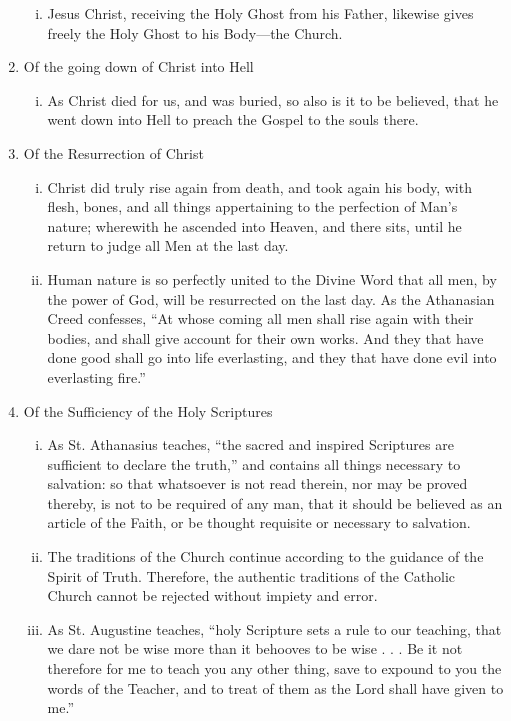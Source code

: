 \begin{enumerate}
\begin{enumerate}[i.]
		\item Jesus Christ, receiving the Holy Ghost from his Father, likewise gives freely the Holy Ghost to his Body---the Church.
	\end{enumerate}
	\item Of the going down of Christ into Hell
	\begin{enumerate}[i.]
		\item As Christ died for us, and was buried, so also is it to be believed, that he went down into Hell to preach the Gospel to the souls there.
	\end{enumerate}
	\item Of the Resurrection of Christ
	\begin{enumerate}[i.]
		\item Christ did truly rise again from death, and took again his body, with flesh, bones, and all things appertaining to the perfection of Man's nature; wherewith he ascended into Heaven, and there sits, until he return to judge all Men at the last day.
		\item Human nature is so perfectly united to the Divine Word that all men, by the power of God, will be resurrected on the last day. As the Athanasian Creed confesses, ``At whose coming all men shall rise again with their bodies, and shall give account for their own works. And they that have done good shall go into life everlasting, and they that have done evil into everlasting fire.''
	\end{enumerate}
\item Of the Sufficiency of the Holy Scriptures
	\begin{enumerate}[i.]
		\item As St. Athanasius teaches, ``the sacred and inspired Scriptures are sufficient to declare the truth,'' and contains all things necessary to salvation: so that whatsoever is not read therein, nor may be proved thereby, is not to be required of any man, that it should be believed as an article of the Faith, or be thought requisite or necessary to salvation.
		\item The traditions of the Church continue according to the guidance of the Spirit of Truth. Therefore, the authentic traditions of the Catholic Church cannot be rejected without impiety and error.
		\item As St. Augustine teaches, ``holy Scripture sets a rule to our teaching, that we dare not be wise more than it behooves to be wise . . . Be it not therefore for me to teach you any other thing, save to expound to you the words of the Teacher, and to treat of them as the Lord shall have given to me.''

\end{enumerate}
\end{enumerate}

